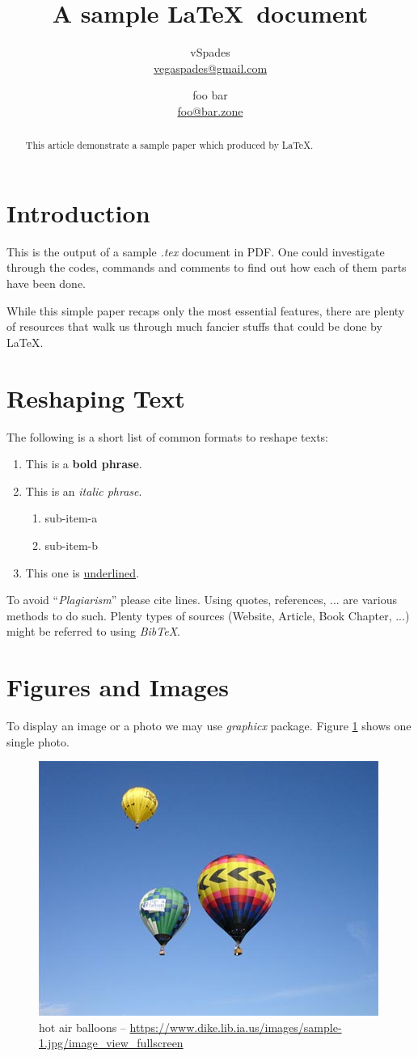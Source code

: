 \documentclass[twocolumn]{article} %
\title{A sample \LaTeX\ document}
\author{
vSpades \\ \url{vegaspades@gmail.com}
\and %
foo bar \\ \url{foo@bar.zone}
}
\date{} %
\begin{document}
\maketitle %
\begin{abstract}
This article demonstrate a sample paper which produced by \LaTeX.
\end{abstract}
\section{Introduction}\indent
This is the output of a sample \textit{.tex} document in PDF. One could
investigate through the codes, commands and comments to find out how each of
them parts have been done.

While this simple paper recaps only the most essential features, there are
plenty of resources \cite{web:1}\cite{web:2}\cite{web:3} that walk us through
much fancier stuffs that could be done by \LaTeX.
\section{Reshaping Text}
The following is a short list of common formats to reshape texts:
\begin{enumerate}
\item This is a \textbf{bold phrase}.
\item This is an \textit{italic phrase}.
	\begin{enumerate}
	\item sub-item-a
	\item sub-item-b
	\end{enumerate}
\item This one is \underline{underlined}.
\end{enumerate}
To avoid ``\emph{Plagiarism}'' please cite lines. Using quotes, references, ...
are various methods to do such. Plenty types of sources (Website, Article, Book
Chapter, ...) \cite{web:4} might be referred to using \textit{BibTeX}.
\section{Figures and Images}
To display an image or a photo we may use \textit{graphicx} package. Figure
\ref{fig:1} shows one single photo.
\begin{figure}[bh!]
\centering
\includegraphics[width=.5\linewidth]{asset/img1.jpeg}
\caption{hot air balloons --
\url{https://www.dike.lib.ia.us/images/sample-1.jpg/image_view_fullscreen}}
\label{fig:1}
\end{figure}
\end{document}
